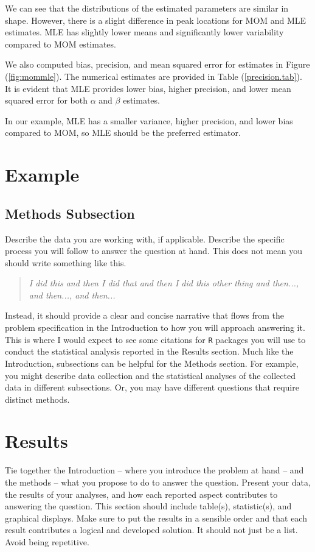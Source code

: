 \documentclass{article}\usepackage[]{graphicx}\usepackage[]{xcolor}
\begin{document}
\begin{multicols}{2}
We can see that the distributions of the estimated parameters are similar in shape. However, there is a slight difference in peak locations for MOM and MLE estimates. MLE has slightly lower means and significantly lower variability compared to MOM estimates.

We also computed bias, precision, and mean squared error for estimates in Figure (\ref{fig:mommle}). The numerical estimates are provided in Table (\ref{precision.tab}). It is evident that MLE provides lower bias, higher precision, and lower mean squared error for both $\alpha$ and $\beta$ estimates.

In our example, MLE has a smaller variance, higher precision, and lower bias compared to MOM, so MLE should be the preferred estimator.


\section{Example}\label{sec:examp}


\subsection{Methods Subsection}
Describe the data you are working with, if applicable. Describe the specific process you will follow to answer the question at hand. This does not mean you should write something like this.
\begin{quote}
\textit{I did this and then I did that and then I did this other thing and then..., and then..., and then...}
\end{quote}
Instead, it should provide a clear and concise narrative that flows from the problem specification in the Introduction to how you will approach answering it. This is where I would expect to see some citations for \texttt{R} packages you will use to conduct the statistical analysis reported in the Results section.
Much like the Introduction, subsections can be helpful for the Methods section. For example, you might describe data collection and the statistical analyses of the collected data in different subsections. Or, you may have different questions that require distinct methods. 

\section{Results}
Tie together the Introduction -- where you introduce the problem at hand -- and the methods --  what you propose to do to answer the question. Present your data, the results of your analyses, and how each reported aspect contributes to answering the question. This section should include table(s), statistic(s), and graphical displays. Make sure to put the results in a sensible order and that each result contributes a logical and developed solution. It should not just be a list. Avoid being repetitive. 


\end{multicols}
\end{document}
